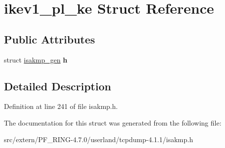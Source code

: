 \hypertarget{structikev1__pl__ke}{
\section{ikev1\_\-pl\_\-ke Struct Reference}
\label{structikev1__pl__ke}
}
\subsection*{Public Attributes}
\begin{DoxyCompactItemize}
\item 
\hypertarget{structikev1__pl__ke_a57c0396adccae8a0bfd48af88c426ce7}{
struct \hyperlink{structisakmp__gen}{isakmp\_\-gen} {\bfseries h}}
\label{structikev1__pl__ke_a57c0396adccae8a0bfd48af88c426ce7}

\end{DoxyCompactItemize}


\subsection{Detailed Description}


Definition at line 241 of file isakmp.h.



The documentation for this struct was generated from the following file:\begin{DoxyCompactItemize}
\item 
src/extern/PF\_\-RING-\/4.7.0/userland/tcpdump-\/4.1.1/isakmp.h\end{DoxyCompactItemize}
